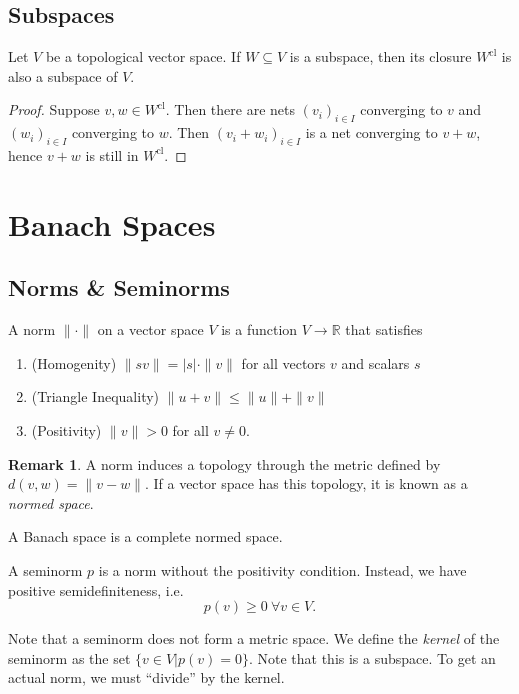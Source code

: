 \documentclass[prb,12pt]{revtex4-2}
\theoremstyle{definition}
\newtheorem{Remark}[Theorem]{Remark}
\theoremstyle{definition}
\theoremstyle{definition}
\newenvironment{parts}{\begin{enumerate}[label=(\alph*)]}{\end{enumerate}}
\newcommand{\R}{\mathbb{R}}
\begin{document}
	\subsection{Subspaces}
	\begin{Theorem}
		Let $V$ be a topological vector space. If $W\subseteq V$ is a subspace, then its closure $W^\text{cl}$ is also a subspace of $V$.
	\end{Theorem}
	\begin{proof}
Suppose $v,w\in W^\text{cl}$. Then there are nets $(v_i)_{i\in I}$ converging to $v$ and $(w_i)_{i\in I}$ converging to $w$. Then $(v_i+w_i)_{i\in I}$ is a net converging to $v+w$, hence $v+w$ is still in $W^\text{cl}$. 
	\end{proof}
	\section{Banach Spaces}
	\subsection{Norms \& Seminorms}
	\begin{Definition}[Norm]
		A norm $\|\cdot\|$ on a vector space $V$ is a function $V\to \R$ that satisfies
		\begin{parts}
			\item (Homogenity) $\|sv\|=|s|\cdot \|v\|$ for all vectors $v$ and scalars $s$
			\item (Triangle Inequality) $\|u+v\|\le \|u\| + \|v\|$
			\item (Positivity) $\|v\|>0$ for all $v\neq 0$.  
		\end{parts}
	\end{Definition}
	\begin{Remark}
		A norm induces a topology through the metric defined by $d(v, w)=\|v-w\|$. If a vector space has this topology, it is known as a \emph{normed space}.
	\end{Remark}
	\begin{Definition}
		A Banach space is a complete normed space.
\end{Definition}
	\begin{Definition}[Seminorm]
		A seminorm $p$ is a norm without the positivity condition. Instead, we have positive semidefiniteness, i.e.
		\[p(v)\ge 0~\forall v\in V.\]
	\end{Definition}
	Note that a seminorm does not form a metric space. We define the \emph{kernel} of the seminorm as the set $\{v\in V|p(v)=0\}$. Note that this is a subspace. To get an actual norm, we must ``divide'' by the kernel.
	
\end{document}
